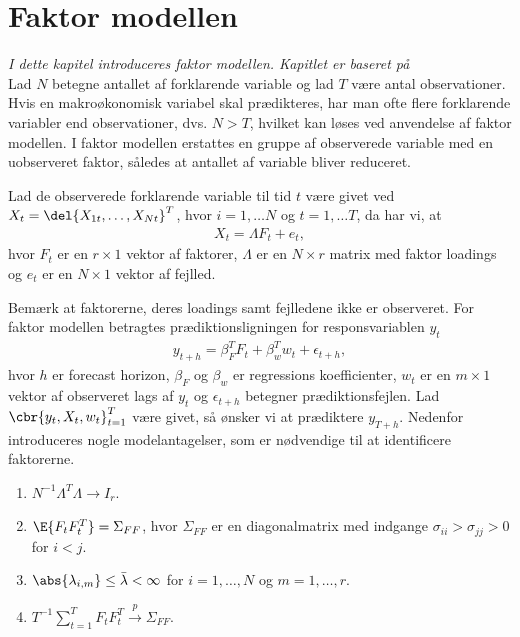 \chapter{Faktor modellen}
\textit{I dette kapitel introduceres faktor modellen. Kapitlet er baseret på \citep{stock_watson_2002a}} \\[2mm]
%
Lad \(N\) betegne antallet af forklarende variable og lad \(T\) være antal observationer.
Hvis en makroøkonomisk variabel skal prædikteres, har man ofte flere forklarende variabler end observationer, dvs. \(N > T\), hvilket kan løses ved anvendelse af faktor modellen. 
I faktor modellen erstattes en gruppe af observerede variable med en uobserveret faktor, således at antallet af variable bliver reduceret.  

\begin{defn}[Faktor Model]
Lad de observerede forklarende variable til tid \(t\) være givet ved $X_t = \del{X_{1t}, \dots, X_{Nt}}^T$, hvor $i = 1, \dots N$ og $t = 1, \dots T$, da har vi, at
\begin{align}
X_t = \Lambda F_t + e_t, \label{eq:factor_model}
\end{align}
hvor  \(F_t\) er en \(r \times 1\) vektor af faktorer, \(\Lambda\) er en \(N \times r\) matrix med faktor loadings og \(e_t\) er en \(N \times 1\) vektor af fejlled.
\end{defn}
Bemærk at faktorerne, deres loadings samt fejlledene ikke er observeret.
For faktor modellen betragtes prædiktionsligningen for responsvariablen \(y_t\)
\begin{align}
y_{t+h} = \beta_F^T F_t + \beta_w^T w_t + \epsilon_{t+h}, \label{eq:factor_model_forecast}
\end{align}
hvor \(h\) er forecast horizon, \(\beta_F\) og \(\beta_w\) er regressions koefficienter, \(w_t\) er en \(m \times 1\) vektor af observeret lags af \(y_t\) og \(\epsilon_{t+h}\) betegner prædiktionsfejlen.
Lad  \(\cbr{y_t, X_t, w_t}_{t=1}^T\) være givet, så ønsker vi at prædiktere \(y_{T+h}\).
%
Nedenfor introduceres nogle modelantagelser, som er nødvendige til at identificere faktorerne.
%
\begin{ass} \label{ass:faktor}
\begin{enumerate}[label=\alph*)]
\item \(N^{-1} \Lambda^T \Lambda \rightarrow I_r\). 
\item \(\E{F_t F_t^T} = \Sigma_{FF}\), hvor \(\Sigma_{FF}\) er en diagonalmatrix med indgange \(\sigma_{ii} > \sigma_{jj} > 0\) for \(i < j\).
\item \(\abs{\lambda_{i,m}} \leq \bar{\lambda} < \infty\) for \(i = 1, \ldots, N\) og \(m = 1, \ldots, r\).
\item \(T^{-1} \sum_{t=1}^T F_t F_t^T \overset{p}{\rightarrow} \Sigma_{FF}\).
\end{enumerate}
\end{ass}
